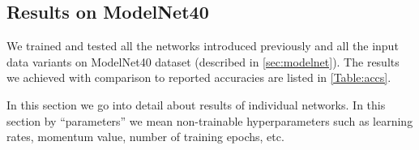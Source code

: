 \subsection{Results on ModelNet40}
We trained and tested all the networks introduced previously and all the input data variants on ModelNet40 dataset (described in \autoref{sec:modelnet}). The results we achieved with comparison to reported accuracies are listed in \autoref{Table:accs}. 

In this section we go into detail about results of individual networks. In this section by “parameters” we mean non-trainable hyperparameters such as learning rates, momentum value, number of training epochs, etc.

\def\myitem #1#2{
	\item { \textbf{#1} \par #2
	}
}

